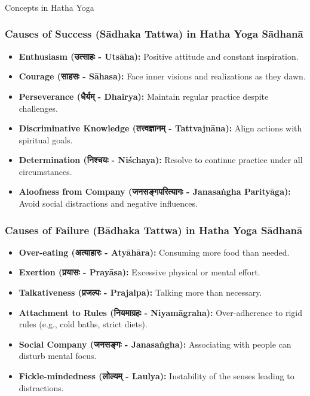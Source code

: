 \begin{frame}[fragile]\frametitle{}
\begin{center}
{\Large Concepts in Hatha Yoga}
\end{center}
\end{frame}

\begin{frame}[fragile]\frametitle{Causes of Success (Sādhaka Tattwa) in Hatha Yoga Sādhanā}
\begin{itemize}
    \item \textbf{Enthusiasm (उत्साहः - Utsāha):} Positive attitude and constant inspiration.
    \item \textbf{Courage (साहसः - Sāhasa):} Face inner visions and realizations as they dawn.
    \item \textbf{Perseverance (धैर्यम् - Dhairya):} Maintain regular practice despite challenges.
    \item \textbf{Discriminative Knowledge (तत्त्वज्ञानम् - Tattvajnāna):} Align actions with spiritual goals.
    \item \textbf{Determination (निश्चयः - Niśchaya):} Resolve to continue practice under all circumstances.
    \item \textbf{Aloofness from Company (जनसङ्गपरित्यागः - Janasaṅgha Parityāga):} Avoid social distractions and negative influences.
\end{itemize}
\end{frame}

\begin{frame}[fragile]\frametitle{Causes of Failure (Bādhaka Tattwa) in Hatha Yoga Sādhanā}
\begin{itemize}
    \item \textbf{Over-eating (अत्याहारः - Atyāhāra):} Consuming more food than needed.
    \item \textbf{Exertion (प्रयासः - Prayāsa):} Excessive physical or mental effort.
    \item \textbf{Talkativeness (प्रजल्पः - Prajalpa):} Talking more than necessary.
    \item \textbf{Attachment to Rules (नियमाग्रहः - Niyamāgraha):} Over-adherence to rigid rules (e.g., cold baths, strict diets).
    \item \textbf{Social Company (जनसङ्गः - Janasaṅgha):} Associating with people can disturb mental focus.
    \item \textbf{Fickle-mindedness (लोल्यम् - Laulya):} Instability of the senses leading to distractions.
\end{itemize}
\end{frame}

